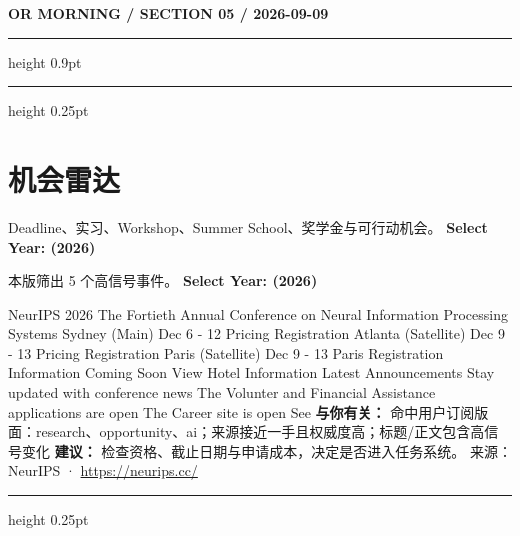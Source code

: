 \documentclass[10.5pt]{ctexart}
\begin{document}
\newpage
{\small\bfseries OR MORNING / SECTION 05 / 2026-09-09}
\vspace{2mm}
\hrule height 0.9pt
\vspace{1.5mm}
\hrule height 0.25pt
\vspace{4mm}
\section*{机会雷达}
{\color{ormuted} Deadline、实习、Workshop、Summer School、奖学金与可行动机会。}
\vspace{2mm}
{\LARGE\bfseries Select Year: (2026)}\par
\vspace{1mm}
{\color{ormuted} 本版筛出 5 个高信号事件。}
\vspace{3mm}
{\Large\bfseries Select Year: (2026)}\par
NeurIPS 2026 The Fortieth Annual Conference on Neural Information Processing Systems Sydney (Main) Dec 6 - 12 Pricing Registration Atlanta (Satellite) Dec 9 - 13 Pricing Registration Paris (Satellite) Dec 9 - 13 Paris Registration Information Coming Soon View Hotel Information Latest Announcements Stay updated with conference news The Volunter and Financial Assistance applications are open The Career site is open See
\textbf{与你有关：} 命中用户订阅版面：research、opportunity、ai；来源接近一手且权威度高；标题/正文包含高信号变化
\textbf{建议：} 检查资格、截止日期与申请成本，决定是否进入任务系统。
{\footnotesize\color{ormuted} 来源：NeurIPS · \url{https://neurips.cc/}}
\vspace{4mm}
\hrule height 0.25pt
\vspace{3mm}
\end{document}
